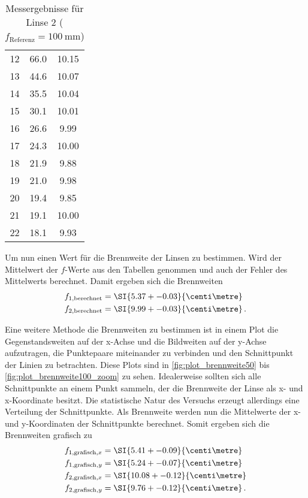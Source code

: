 \begin{table}
    \centering
    \caption{Messergebnisse für Linse 2 ($f_\text{Referenz}=\SI{100}{\milli\metre}$)}
    \begin{tabular}{S[table-format=2.0] S[table-format=2.1] S[table-format=1.2]}
        \toprule
         &  &  \\
         & 66.0 & 10.15 \\
        13 & 44.6 & 10.07 \\
        14 & 35.5 & 10.04 \\
        15 & 30.1 & 10.01 \\
        16 & 26.6 & 9.99 \\
        17 & 24.3 & 10.00 \\
        18 & 21.9 & 9.88 \\
        19 & 21.0 & 9.98 \\
        20 & 19.4 & 9.85 \\
        21 & 19.1 & 10.00 \\
        22 & 18.1 & 9.93 \\
        \bottomrule
    \end{tabular}
    \label{tab:brennweite100}
\end{table}

Um nun einen Wert für die Brennweite der Linsen zu bestimmen. 
Wird der Mittelwert der $f$-Werte aus den Tabellen genommen und auch der Fehler des Mittelwerts berechnet.
Damit ergeben sich die Brennweiten
\begin{align*}
    f_{1,\text{berechnet}} &= \SI{5.37+-0.03}{\centi\metre} \\
    f_{2,\text{berechnet}} &= \SI{9.99+-0.03}{\centi\metre} \, .
\end{align*}

Eine weitere Methode die Brennweiten zu bestimmen ist in einem Plot die Gegenstandsweiten auf der x-Achse und die Bildweiten auf der y-Achse aufzutragen, die Punktepaare miteinander zu verbinden und den Schnittpunkt der Linien zu betrachten.
Diese Plots sind in \autoref{fig:plot_brennweite50} bis \ref{fig:plot_brennweite100_zoom} zu sehen.
Idealerweise sollten sich alle Schnittpunkte an einem Punkt sammeln, der die Brennweite der Linse als x- und x-Koordinate besitzt.
Die statistische Natur des Versuchs erzeugt allerdings eine Verteilung der Schnittpunkte.
Als Brennweite werden nun die Mittelwerte der x- und y-Koordinaten der Schnittpunkte berechnet.
Somit ergeben sich die Brennweiten grafisch zu
\begin{align*}
    f_{1,\text{grafisch},x} &= \SI{5.41+-0.09}{\centi\metre} \\
    f_{1,\text{grafisch},y} &= \SI{5.24+-0.07}{\centi\metre} \\
    f_{2,\text{grafisch},x} &= \SI{10.08+-0.12}{\centi\metre} \\
    f_{2,\text{grafisch},y} &= \SI{9.76+-0.12}{\centi\metre} \, .
\end{align*}

